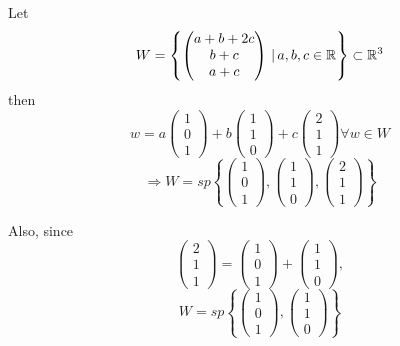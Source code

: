 \documentclass[a4paper,10pt]{article}
\begin{document}
\begin{ex}
	Let
	\[
		W = \left\{
			\begin{pmatrix}
				a + b + 2c \\
				b + c \\
				a + c
			\end{pmatrix}
			\, | \, a,b,c \in \mathbb{R}
		\right\}
		\subset \mathbb{R}^3
	\]
	then
	\[
		w = a
		\begin{pmatrix}
			1 \\
			0 \\
			1
		\end{pmatrix}
		+ b
		\begin{pmatrix}
			1 \\
			1 \\
			0
		\end{pmatrix}
		+ c
		\begin{pmatrix}
			2 \\
			1 \\
			1
		\end{pmatrix}
		\forall w \in W
	\]
	\[
		\Rightarrow W = sp\left\{
			\begin{pmatrix}
				1 \\
				0 \\
				1
			\end{pmatrix}
			,
			\begin{pmatrix}
				1 \\
				1 \\
				0
			\end{pmatrix}
			,
			\begin{pmatrix}
				2 \\
				1 \\
				1
			\end{pmatrix}
		\right\}
	\]

	Also, since
	\[
		\begin{pmatrix}
			2 \\
			1 \\
			1
		\end{pmatrix}
		=
		\begin{pmatrix}
			1 \\
			0 \\
			1
		\end{pmatrix}
		+
		\begin{pmatrix}
			1 \\
			1 \\
			0
		\end{pmatrix},
	\]
	\[
		W = sp\left\{
			\begin{pmatrix}
				1 \\
				0 \\
				1
			\end{pmatrix}
			,
			\begin{pmatrix}
				1 \\
				1 \\
				0
			\end{pmatrix}
		\right\}
	\]
\end{ex}
\end{document}
